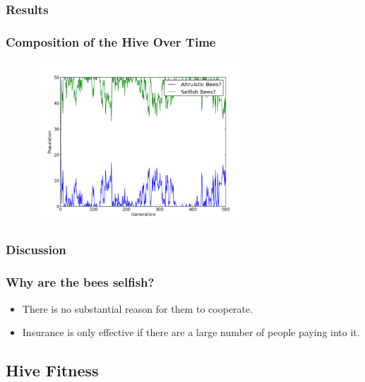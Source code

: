 \documentclass{beamer}
\begin{document}

      \subsubsection{Results} %
      \label{ssub:results}

        \begin{frame}[t]\frametitle{Composition of the Hive Over Time}
          \begin{figure}
          \includegraphics[width=8cm]{s_bees.png}
          \end{figure}
        \end{frame}
      

      \subsubsection{Discussion} %
      \label{ssub:discussion}
        \begin{frame}[c]\frametitle{Why are the bees selfish?}
            
          \begin{itemize}
            \item There is no substantial reason for them to cooperate.
            \item Insurance is only effective if there are a large number of
                  people paying into it.
          \end{itemize}
        
        \end{frame}

    \subsection{Hive Fitness} %
    \label{sub:hive_fitness}
\end{document}
